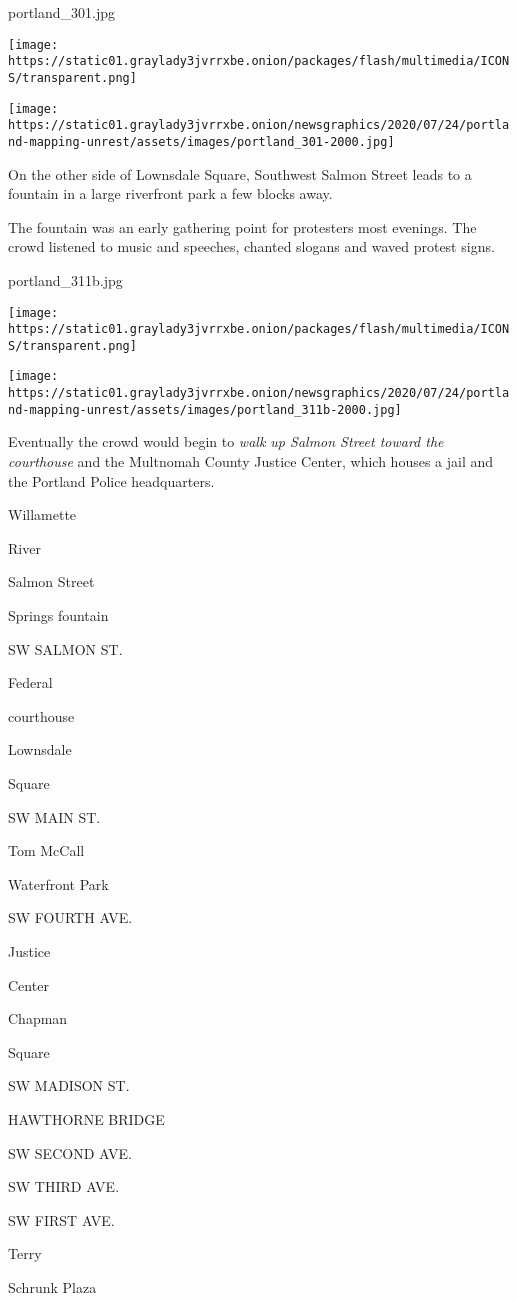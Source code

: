 portland\_301.jpg

\texttt{[image: https://static01.graylady3jvrrxbe.onion/packages/flash/multimedia/ICONS/transparent.png]}

\texttt{[image: https://static01.graylady3jvrrxbe.onion/newsgraphics/2020/07/24/portland-mapping-unrest/assets/images/portland\_301-2000.jpg]}

On the other side of Lownsdale Square, Southwest Salmon Street leads to
a fountain in a large riverfront park a few blocks away.

The fountain was an early gathering point for protesters most evenings.
The crowd listened to music and speeches, chanted slogans and waved
protest signs.

portland\_311b.jpg

\texttt{[image: https://static01.graylady3jvrrxbe.onion/packages/flash/multimedia/ICONS/transparent.png]}

\texttt{[image: https://static01.graylady3jvrrxbe.onion/newsgraphics/2020/07/24/portland-mapping-unrest/assets/images/portland\_311b-2000.jpg]}

Eventually the crowd would begin to \emph{walk up Salmon Street toward
the courthouse} and the Multnomah County Justice Center, which houses a
jail and the Portland Police headquarters.

Willamette

River

Salmon Street

Springs fountain

SW SALMON ST.

Federal

courthouse

Lownsdale

Square

SW MAIN ST.

Tom McCall

Waterfront Park

SW FOURTH AVE.

Justice

Center

Chapman

Square

SW MADISON ST.

HAWTHORNE BRIDGE

SW SECOND AVE.

SW THIRD AVE.

SW FIRST AVE.

Terry

Schrunk Plaza

